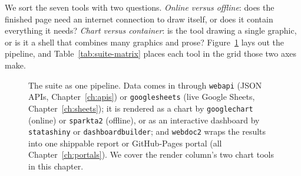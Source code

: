\documentclass[
    a4paper,
    fontsize=10pt,
    twoside=true,
    numbers=noenddot,
]{kaobook}
\begin{document}
We sort the seven tools with two questions. \emph{Online versus offline}: does the finished page need an internet connection to draw itself, or does it contain everything it needs? \emph{Chart versus container}: is the tool drawing a single graphic, or is it a shell that combines many graphics and prose? Figure~\ref{fig:suite-pipeline} lays out the pipeline, and Table~\ref{tab:suite-matrix} places each tool in the grid those two axes make.

\begin{figure}[htbp]
\centering
{}
\caption[The visualization suite pipeline]{The suite as one pipeline. Data comes in through \texttt{webapi} (JSON APIs, Chapter~\ref{ch:apis}) or \texttt{googlesheets} (live Google Sheets, Chapter~\ref{ch:sheets}); it is rendered as a chart by \texttt{googlechart} (online) or \texttt{sparkta2} (offline), or as an interactive dashboard by \texttt{statashiny} or \texttt{dashboardbuilder}; and \texttt{webdoc2} wraps the results into one shippable report or GitHub-Pages portal (all Chapter~\ref{ch:portals}). We cover the render column's two chart tools in this chapter.}
\label{fig:suite-pipeline}
\end{figure}
\end{document}
